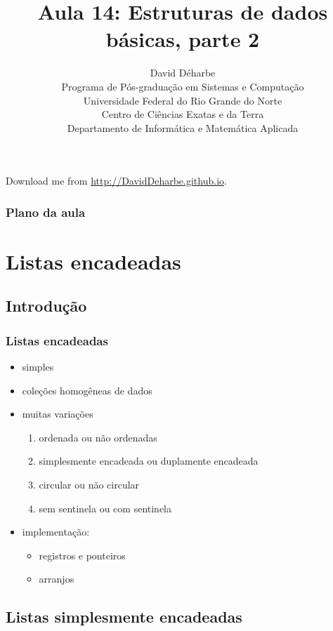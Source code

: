 \documentclass{beamer}
\title{Aula 14: Estruturas de dados básicas, parte 2}
\author{David Déharbe \\
  Programa de Pós-graduação em Sistemas e Computação \\
  Universidade Federal do Rio Grande do Norte \\
  Centro de Ciências Exatas e da Terra \\
  Departamento de Informática e Matemática Aplicada}
\date{}
\begin{document}
\begin{frame}
  \titlepage
  Download me from \url{http://DavidDeharbe.github.io}.
\end{frame}

\begin{frame}
  \frametitle{Plano da aula}
  \tableofcontents
\end{frame}

\section{Listas encadeadas}

\subsection{Introdução}

\begin{frame}
  \frametitle{Listas encadeadas}

  \begin{itemize}
  \item simples
  \item coleções homogêneas de dados
  \item muitas variações
    \begin{enumerate}
      \item ordenada ou não ordenadas
      \item simplesmente encadeada ou duplamente encadeada
      \item circular ou não circular
      \item sem sentinela ou com sentinela
    \end{enumerate}
  \item implementação:
    \begin{itemize}
      \item registros e ponteiros
      \item arranjos
    \end{itemize}
  \end{itemize}

\end{frame}

\subsection{Listas simplesmente encadeadas}
\end{document}
